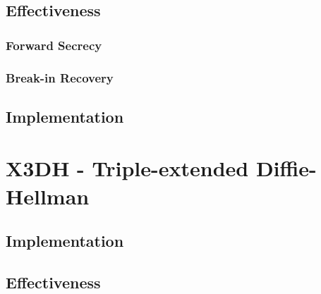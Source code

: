 \subsection{Effectiveness}


\subsubsection{Forward Secrecy}


\subsubsection{Break-in Recovery}


\subsection{Implementation}


\section{X3DH - Triple-extended Diffie-Hellman}


\subsection{Implementation}


\subsection{Effectiveness}




